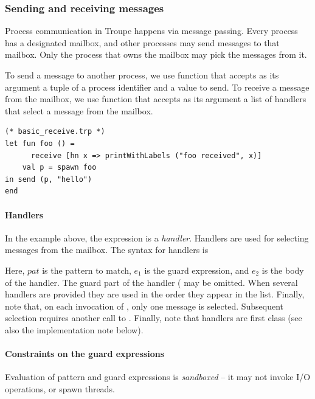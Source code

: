 \subsubsection{Sending and receiving messages}
Process communication in Troupe happens via message passing.  Every process has a designated mailbox,
and other processes may send messages to that mailbox. Only the process that owns the mailbox may pick the messages from it.


To send a message to another process, we use function  that accepts as its argument a tuple of
a process identifier and a value to send. To receive a message from the mailbox, we use function 
that accepts as its argument a list of handlers that select a message from the mailbox.



\begin{lstlisting}
(* basic_receive.trp *)
let fun foo () =
      receive [hn x => printWithLabels ("foo received", x)]
    val p = spawn foo
in send (p, "hello")
end    
\end{lstlisting}


\paragraph{Handlers}\label{sec:handlers} 
In the example above, the expression  is a \emph{handler}. 
Handlers are used for selecting messages from the mailbox. The syntax for handlers is
\begin{center}
 \end{center}
 
 Here, $\mathit{pat}$ is the pattern to match, $\mathit{e_1}$ is the guard expression, and $\mathit{e_2}$ is the body of the handler. 
 The guard part of the handler ( may be omitted. 
 When several handlers are provided they are used in the order they appear in the list.
Finally, note that, on each invocation of , only one message is selected. Subsequent selection
requires another call to .
Finally, note that handlers are first class (see also the implementation note below).  

\paragraph{Constraints on the guard expressions}
Evaluation of pattern and guard expressions is \emph{sandboxed} -- it may not invoke I/O operations, or 
spawn threads.


